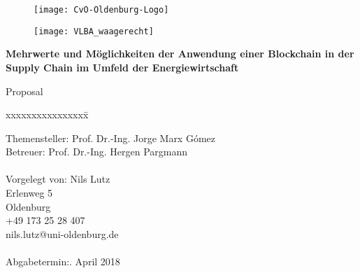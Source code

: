 \begin{titlepage}
  \begin{centering}
  \begin{figure}[h!]
    \centering
    \texttt{[image: CvO-Oldenburg-Logo]}    %
  \end{figure}

  \vspace*{-0.8cm}

  \begin{figure}[h!]
    \centering
    \texttt{[image: VLBA\_waagerecht]}    %
  \end{figure}

  \vspace*{0.4cm}
  
  \textsf{\Huge \textbf{Mehrwerte und Möglichkeiten der Anwendung einer Blockchain in der Supply Chain im Umfeld der Energiewirtschaft\\}}

  \vspace*{0.5cm}
  \noindent Proposal\\

  \end{centering}
  
  \vspace*{1.5cm}
  \begin{tabbing}
  xxxxxxxxxxxxxxxx\= \kill
  
  \small Themensteller:\> Prof. Dr.-Ing. Jorge Marx Gómez\\
  \small Betreuer:\> Prof. Dr.-Ing. Hergen Pargmann\\\\

  \small Vorgelegt von: \>Nils Lutz\\
  \small \>Erlenweg 5\\
  \small {} Oldenburg\\
  \small \>+49 173 25 28 407\\
  \small \>nils.lutz@uni-oldenburg.de\\\\

  \small Abgabetermin:. April 2018
  \end{tabbing}
\end{titlepage}
\newpage